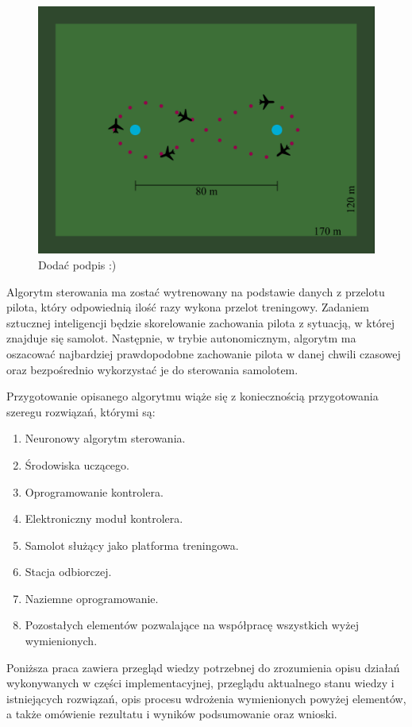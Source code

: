 \documentclass[12pt, a4paper]{article}
\begin{document}
\begin{figure}[ht]
    \centering
    \includegraphics[width=1\textwidth]{osemka}
    \caption{Dodać podpis :)}
\end{figure}

Algorytm sterowania ma zostać wytrenowany na podstawie danych z przelotu pilota, który odpowiednią ilość razy wykona przelot treningowy. Zadaniem sztucznej inteligencji będzie skorelowanie zachowania pilota z sytuacją, w której znajduje się samolot. Następnie, w trybie autonomicznym, algorytm ma oszacować najbardziej prawdopodobne zachowanie pilota w danej chwili czasowej oraz bezpośrednio wykorzystać je do sterowania samolotem. 

Przygotowanie opisanego algorytmu wiąże się z koniecznością przygotowania szeregu rozwiązań, którymi są:
\begin{enumerate}
	\item Neuronowy algorytm sterowania.
	\item Środowiska uczącego.
	\item Oprogramowanie kontrolera.
	\item Elektroniczny moduł kontrolera.
	\item Samolot służący jako platforma treningowa.
	\item Stacja odbiorczej.
	\item Naziemne oprogramowanie.
	\item Pozostałych elementów pozwalające na współpracę wszystkich wyżej wymienionych.
\end{enumerate}

Poniższa praca zawiera przegląd wiedzy potrzebnej do zrozumienia opisu działań wykonywanych w części implementacyjnej, przeglądu aktualnego stanu wiedzy i istniejących rozwiązań, opis procesu wdrożenia wymienionych powyżej elementów, a także omówienie rezultatu i wyników podsumowanie oraz wnioski.
\end{document}
